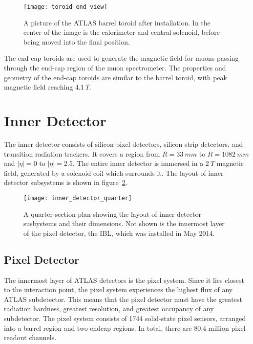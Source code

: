 \begin{figure}[h]
\texttt{[image: toroid\_end\_view]}
\caption{A picture of the ATLAS barrel toroid after installation. In
  the center of the image is the calorimeter and central solenoid,
  before being moved into the final position.}
\label{fig:toroid_end_view}
\end{figure}

The end-cap toroids are used to generate the magnetic field for muons passing through the end-cap region of the muon spectrometer.
The properties and geometry of the end-cap toroids are similar to the barrel toroid,
with peak magnetic field reaching $4.1~T$\cite{atlas-detector-2008}.

\section{Inner Detector}\label{sec:inner_detector}
The inner detector consists of silicon pixel detectors, silicon strip detectors, and transition radiation trackers.
It covers a region from $R = 33~mm$ to $R = 1082~mm$ and $|\eta| = 0$ to $|\eta| = 2.5$.
The entire inner detector is immersed in a $2~T$ magnetic field, generated by a
solenoid coil which surrounds it.\cite{atlas-detector-2008}
The layout of inner detector subsystems is shown in figure~\ref{fig:inner_detector_quarter}.

\begin{figure}[h]
\texttt{[image: inner\_detector\_quarter]}
\caption{A quarter-section plan showing the layout of inner detector susbystems and their dimensions.
Not shown is the innermost layer of the pixel detector, the IBL, which was installed in May 2014.}
\label{fig:inner_detector_quarter}
\end{figure}

\subsection{Pixel Detector}\label{subsec:pixel}

The innermost layer of ATLAS detectors is the pixel system.
Since it lies closest to the interaction point, the pixel system experiences the highest flux of any ATLAS subdetector.
This means that the pixel detector must have the greatest radiation hardness, greatest resolution,
and greatest occupancy of any subdetector.\cite{atlas-detector-2008}
The pixel system consists of 1744 solid-state pixel sensors, arranged into a barrel region and two endcap regions.
In total, there are 80.4 million pixel readout channels.\cite{atlas-detector-2008}

